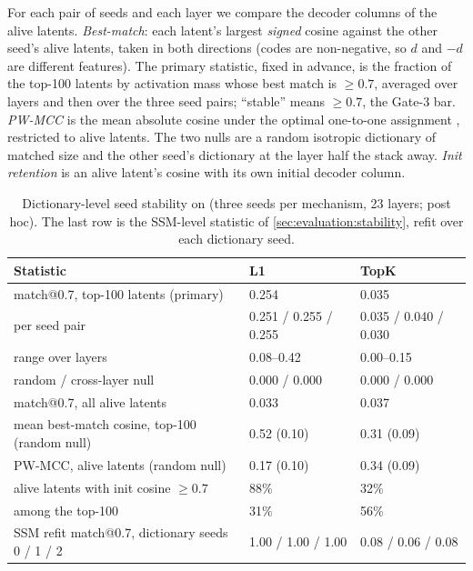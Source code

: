 For each pair of seeds and each layer we compare the decoder columns of the
alive latents. \emph{Best-match}: each latent's largest \emph{signed} cosine
against the other seed's alive latents, taken in both directions (codes are
non-negative, so $d$ and $-d$ are different features). The primary
statistic, fixed in advance, is the fraction of the top-100 latents by
activation mass whose best match is $\ge 0.7$, averaged over layers and then
over the three seed pairs; ``stable'' means $\ge 0.7$, the Gate-3 bar.
\emph{PW-MCC} is the mean absolute cosine under the optimal one-to-one
assignment \citep{song2026consistency}, restricted to alive latents. The two
nulls are a random isotropic dictionary of matched size and the other seed's
dictionary at the layer half the stack away. \emph{Init retention} is an
alive latent's cosine with its own initial decoder column.

\begin{table}[t]
  \centering
  \small
  \caption{Dictionary-level seed stability on \pythia{} (three seeds per
  mechanism, 23 layers; post hoc). The last row is the SSM-level statistic
  of \cref{sec:evaluation:stability}, refit over each dictionary seed.}
  \label{tab:dictseeds}
  \begin{tabular}{lll}
    \toprule
    Statistic & L1 & TopK \\
    \midrule
    match@0.7, top-100 latents (primary) & 0.254 & 0.035 \\
    \quad per seed pair & 0.251 / 0.255 / 0.255 & 0.035 / 0.040 / 0.030 \\
    \quad range over layers & 0.08--0.42 & 0.00--0.15 \\
    \quad random / cross-layer null & 0.000 / 0.000 & 0.000 / 0.000 \\
    match@0.7, all alive latents & 0.033 & 0.037 \\
    mean best-match cosine, top-100 (random null) & 0.52 (0.10) & 0.31 (0.09) \\
    PW-MCC, alive latents (random null) & 0.17 (0.10) & 0.34 (0.09) \\
    alive latents with init cosine $\ge 0.7$ & 88\% & 32\% \\
    \quad among the top-100 & 31\% & 56\% \\
    \midrule
    SSM refit match@0.7, dictionary seeds 0 / 1 / 2 & 1.00 / 1.00 / 1.00 & 0.08 / 0.06 / 0.08 \\
    \bottomrule
  \end{tabular}
\end{table}

